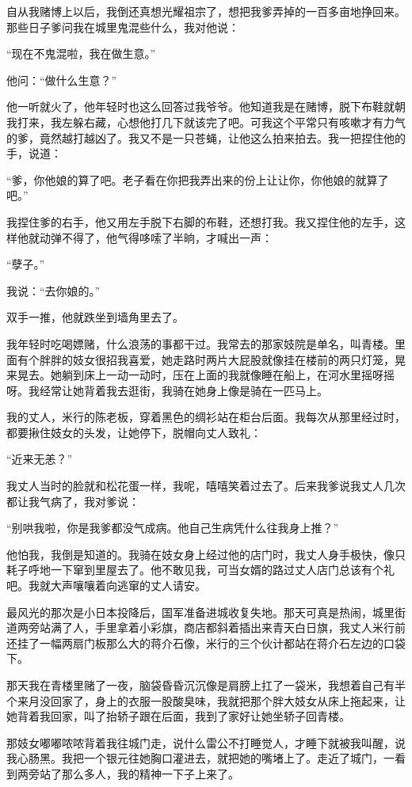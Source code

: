 \documentclass[12pt,UTF8]{ctexbook}
\begin{document}
自从我赌博上以后，我倒还真想光耀祖宗了，想把我爹弄掉的一百多亩地挣回来。那些日子爹问我在城里鬼混些什么，我对他说：

“现在不鬼混啦，我在做生意。”

他问：“做什么生意？”

他一听就火了，他年轻时也这么回答过我爷爷。他知道我是在赌博，脱下布鞋就朝我打来，我左躲右藏，心想他打几下就该完了吧。可我这个平常只有咳嗽才有力气的爹，竟然越打越凶了。我又不是一只苍蝇，让他这么拍来拍去。我一把捏住他的手，说道：

“爹，你他娘的算了吧。老子看在你把我弄出来的份上让让你，你他娘的就算了吧。”

我捏住爹的右手，他又用左手脱下右脚的布鞋，还想打我。我又捏住他的左手，这样他就动弹不得了，他气得哆嗦了半晌，才喊出一声：

“孽子。”

我说：“去你娘的。”

双手一推，他就跌坐到墙角里去了。

我年轻时吃喝嫖赌，什么浪荡的事都干过。我常去的那家妓院是单名，叫青楼。里面有个胖胖的妓女很招我喜爱，她走路时两片大屁股就像挂在楼前的两只灯笼，晃来晃去。她躺到床上一动一动时，压在上面的我就像睡在船上，在河水里摇呀摇呀。我经常让她背着我去逛街，我骑在她身上像是骑在一匹马上。

我的丈人，米行的陈老板，穿着黑色的绸衫站在柜台后面。我每次从那里经过时，都要揪住妓女的头发，让她停下，脱帽向丈人致礼：

“近来无恙？”

我丈人当时的脸就和松花蛋一样，我呢，嘻嘻笑着过去了。后来我爹说我丈人几次都让我气病了，我对爹说：

“别哄我啦，你是我爹都没气成病。他自己生病凭什么往我身上推？”

他怕我，我倒是知道的。我骑在妓女身上经过他的店门时，我丈人身手极快，像只耗子呼地一下窜到里屋去了。他不敢见我，可当女婿的路过丈人店门总该有个礼吧。我就大声嚷嚷着向逃窜的丈人请安。

最风光的那次是小日本投降后，国军准备进城收复失地。那天可真是热闹，城里街道两旁站满了人，手里拿着小彩旗，商店都斜着插出来青天白日旗，我丈人米行前还挂了一幅两扇门板那么大的蒋介石像，米行的三个伙计都站在蒋介石左边的口袋下。

那天我在青楼里赌了一夜，脑袋昏昏沉沉像是肩膀上扛了一袋米，我想着自己有半个来月没回家了，身上的衣服一股酸臭味，我就把那个胖大妓女从床上拖起来，让她背着我回家，叫了抬轿子跟在后面，我到了家好让她坐轿子回青楼。

那妓女嘟嘟哝哝背着我往城门走，说什么雷公不打睡觉人，才睡下就被我叫醒，说我心肠黑。我把一个银元往她胸口灌进去，就把她的嘴堵上了。走近了城门，一看到两旁站了那么多人，我的精神一下子上来了。
\end{document}
